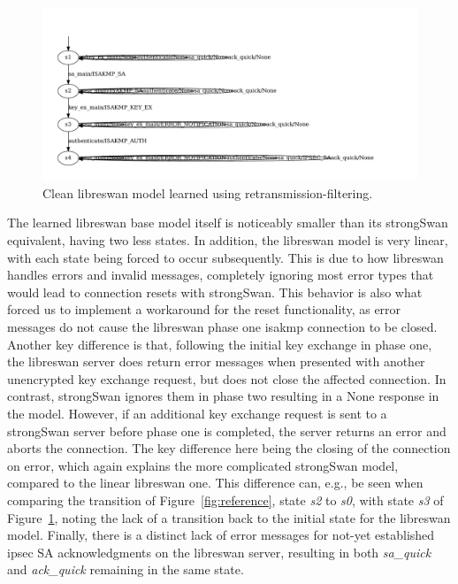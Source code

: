 \begin{figure}[H]
	\centering
	\includegraphics[width=\linewidth]{images/models/LearnedModelLibreSimple}
	\caption{Clean libreswan model learned using retransmission-filtering.}
	\label{fig:learnedmodellibresimple}
\end{figure}

The learned libreswan base model itself is noticeably smaller than its strongSwan equivalent, having two less states. In addition, the libreswan model is very linear, with each state being forced to occur subsequently. This is due to how libreswan handles errors and invalid messages, completely ignoring most error types that would lead to connection resets with strongSwan. This behavior is also what forced us to implement a workaround for the reset functionality, as error messages do not cause the libreswan phase one \ac{isakmp} connection to be closed. Another key difference is that, following the initial key exchange in phase one, the libreswan server does return error messages when presented with another unencrypted key exchange request, but does not close the affected connection. In contrast, strongSwan ignores them in phase two resulting in a None response in the model. However, if an additional key exchange request is sent to a strongSwan server before phase one is completed, the server returns an error and aborts the connection. The key difference here being the closing of the connection on error, which again explains the more complicated strongSwan model, compared to the linear libreswan one. This difference can, e.g., be seen when comparing the transition of Figure~\ref{fig:reference}, state \emph{s2} to \emph{s0}, with state \emph{s3} of Figure~\ref{fig:learnedmodellibresimple}, noting the lack of a transition back to the initial state for the libreswan model. Finally, there is a distinct lack of error messages for not-yet established \ac{ipsec} SA acknowledgments on the libreswan server, resulting in both \emph{sa\_quick} and \emph{ack\_quick} remaining in the same state. 
\newpage


